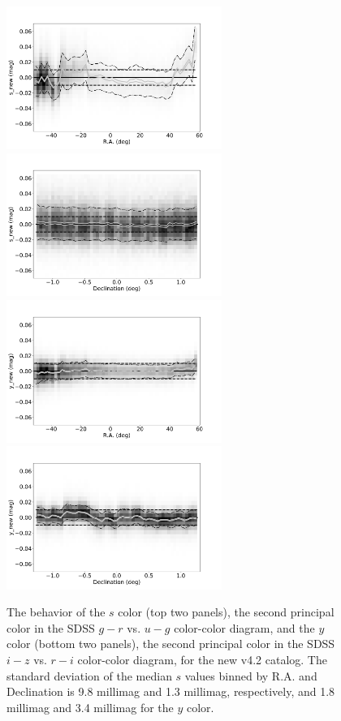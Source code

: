 \documentclass[fleqn,usenatbib]{mnras}
\begin{document}
\begin{figure}[th!]
    \centering\includegraphics[width=7cm]{figures/testV26vsV42_snew_u_s_new_RA_Hess.png}
    \centering\includegraphics[width=7cm]{figures/testV26vsV42_snew_u_s_new_Dec_Hess.png} 
    \centering\includegraphics[width=7cm]{figures/testV26vsV42_ynew_z_y_new_RA_Hess.png} 
    \centering\includegraphics[width=7cm]{figures/testV26vsV42_ynew_z_y_new_Dec_Hess.png}  
\caption{The behavior of the $s$ color (top two panels), the second principal color in the SDSS
$g-r$ vs. $u-g$ color-color diagram, and the $y$ color (bottom two panels), the second 
principal color in the SDSS $i-z$ vs. $r-i$ color-color diagram, for the new v4.2 catalog.
The standard deviation of the median $s$ values binned by R.A. and Declination is 9.8 millimag 
and 1.3 millimag, respectively, and 1.8 millimag and 3.4 millimag for the $y$ color.}
\label{fig:comparesy} 
\end{figure}
\end{document}
